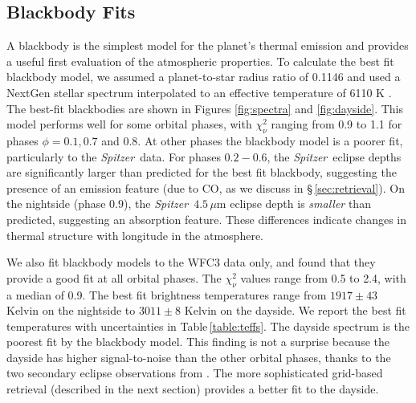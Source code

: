 \documentclass[twocolumn]{aastex61}
\newcommand{\project}[1]{\textsl{#1}}
\newcommand{\Spitzer}{\project{Spitzer}}
\begin{document}
\subsection{Blackbody Fits}
A blackbody is the simplest model for the planet's thermal emission and provides a useful first evaluation of the atmospheric properties. To calculate the best fit blackbody model, we assumed a planet-to-star radius ratio of 0.1146 and used a NextGen stellar spectrum interpolated to an effective temperature of 6110 K \citep{allard12}.  The best-fit blackbodies are shown in Figures \ref{fig:spectra} and \ref{fig:dayside}. This model performs well for some orbital phases, with $\chi^2_\nu$ ranging from 0.9 to 1.1 for phases $\phi = 0.1, 0.7$ and $0.8$. At other phases the blackbody model is a poorer fit, particularly to the \Spitzer\ data. For phases $0.2 - 0.6$, the \Spitzer\ eclipse depths are significantly larger than predicted for the best fit blackbody, suggesting the presence of an emission feature (due to CO, as we discuss in \S\,\ref{sec:retrieval}). On the nightside (phase $0.9$), the \Spitzer\ $4.5\,\mu$m eclipse depth is \emph{smaller} than predicted, suggesting an absorption feature. These differences indicate changes in thermal structure with longitude in the atmosphere.

We also fit blackbody models to the WFC3 data only, and found that they provide a good fit at all orbital phases. The $\chi^2_\nu$ values range from 0.5 to 2.4, with a median of 0.9. The best fit brightness temperatures range from $1917 \pm 43$ Kelvin on the nightside to $3011 \pm 8$ Kelvin on the dayside. We report the best fit temperatures with uncertainties in Table\,\ref{table:teffs}.  The dayside spectrum is the poorest fit by the blackbody model. This finding is not a surprise because the dayside has higher signal-to-noise than the other orbital phases, thanks to the two secondary eclipse observations from \cite{cartier17}. The more sophisticated grid-based retrieval (described in the next section) provides a better fit to the dayside.
\end{document}
